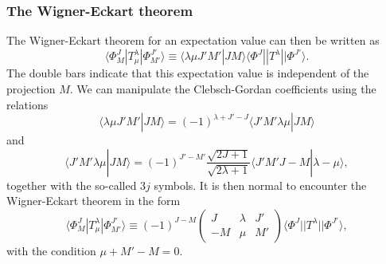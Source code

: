 \documentclass[compress]{beamer}
\begin{document}
\frame
{
\frametitle{The Wigner-Eckart theorem}
\begin{small}
{\scriptsize
The Wigner-Eckart theorem for an expectation value can then be written as 
\[
\langle \Phi^J_M|T^{\lambda}_{\mu}|\Phi^{J'}_{M'}\rangle\equiv\langle \lambda \mu J'M'|JM\rangle\langle \Phi^J||T^{\lambda}||\Phi^{J'}\rangle.
\]
The double bars indicate that this expectation value is independent of the projection $M$.
We can manipulate the Clebsch-Gordan coefficients using the relations
\[
\langle \lambda \mu J'M'|JM\rangle= (-1)^{\lambda+J'-J}\langle J'M'\lambda \mu |JM\rangle 
\]
and 
\[
\langle J'M'\lambda \mu |JM\rangle =(-1)^{J'-M'}\frac{\sqrt{2J+1}}{\sqrt{2\lambda+1}}\langle J'M'J-M |\lambda-\mu\rangle,
\]
together with the so-called $3j$ symbols.
It is then normal to encounter the Wigner-Eckart theorem in the form 
\[
\langle \Phi^J_M|T^{\lambda}_{\mu}|\Phi^{J'}_{M'}\rangle\equiv(-1)^{J-M}\left(\begin{array}{ccc}  J & \lambda & J' \\ -M & \mu & M'\end{array}\right)\langle \Phi^J||T^{\lambda}||\Phi^{J'}\rangle,
\]
with the condition $\mu+M'-M=0$.
}
\end{small}

}
\end{document}
